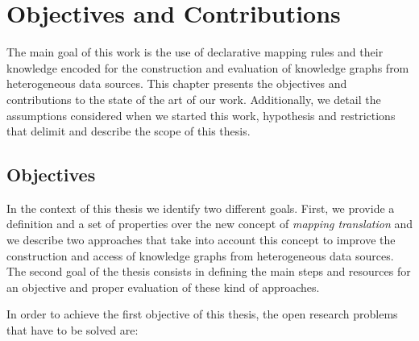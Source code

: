 
\chapter{Objectives and Contributions}
\label{chap:objectives}
The main goal of this work is the use of declarative mapping rules and their knowledge encoded for the construction and evaluation of knowledge graphs from heterogeneous data sources. This chapter presents the objectives and contributions to the state of the art of our work. Additionally, we detail the assumptions considered when we started this work, hypothesis and restrictions that delimit and describe the scope of this thesis.

\section{Objectives}
In the context of this thesis we identify two different goals. First, we provide a definition and a set of properties over the new concept of \textit{mapping translation} and we describe two approaches that take into account this concept to improve the construction and access of knowledge graphs from heterogeneous data sources. The second goal of the thesis consists in defining the main steps and resources for an objective and proper evaluation of these kind of approaches.

In order to achieve the first objective of this thesis, the open research problems that have to be solved are:

